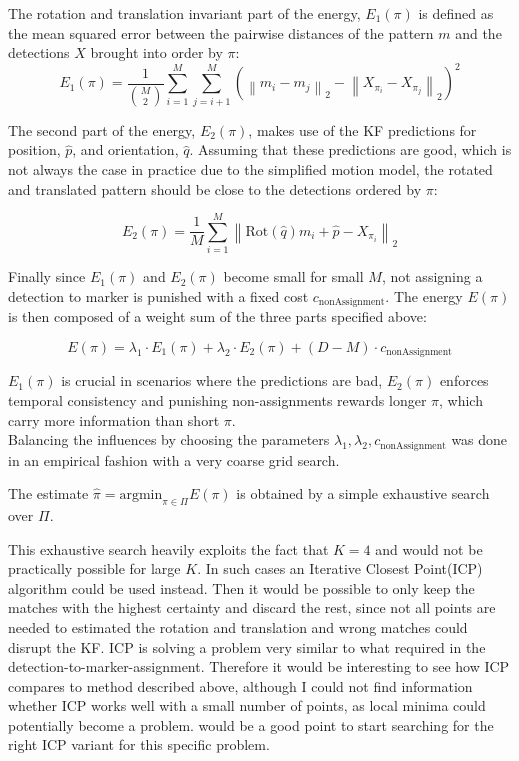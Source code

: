 \documentclass{article}
\begin{document}
The rotation and translation invariant part of the energy, $E_1(\pi)$ is defined as the mean squared error between the pairwise distances of the pattern  $m$ and the detections  $X$ brought into order by $\pi$:
\begin{equation}
	E_1(\pi) =  \frac{1}{\binom{M}{2}}\sum_{i =1}^M\sum_{j =i+1}^M \left( \left\| m_i - m_j\right\|_2 - \left\| X_{\pi_i} - X_{\pi_j}\right\|_2 \right)^2
\end{equation}

The second part of the energy, $E_2(\pi)$, makes use of the KF predictions  for position, $\hat{p}$,  and orientation, $\hat{q}$. Assuming that these predictions are good, which is not always the case in practice due to the simplified motion model, the rotated and translated pattern should be close to the detections ordered by $\pi$:

\begin{equation}
	E_2(\pi) = \frac{1}{M}\sum_{i =1}^M \left\| \text{Rot}(\hat{q})m_i + \hat{p}- X_{\pi_i}\right\|_2 
\end{equation}

Finally since $E_1(\pi)$ and $E_2(\pi) $ become small for small $M$, not assigning a detection to marker is punished with a fixed cost $c_{\text{nonAssignment}}$. The energy $E(\pi)$ is then composed of a weight sum of the three parts specified above:

\begin{equation}
	E(\pi) = \lambda_1 \cdot E_1(\pi) + \lambda_2 \cdot E_2(\pi) + (D-M) \cdot c_{\text{nonAssignment}}
\end{equation}

$E_1(\pi)$ is crucial in scenarios where the predictions are bad, $E_2(\pi)$ enforces temporal consistency and punishing non-assignments rewards longer $\pi$, which carry more information than short $\pi$.\\
Balancing the influences by choosing the parameters $\lambda_1, \lambda_2, c_{\text{nonAssignment}}$ was done in an empirical fashion with a very coarse grid search. %

The estimate 
$
	\hat{\pi} = \text{argmin}_{\pi \in \Pi} E(\pi)
$
is obtained by a simple exhaustive search over $\Pi$.



This exhaustive search heavily exploits the fact that $K=4$ and would not be practically possible for large $K$. In such cases an Iterative Closest Point(ICP) \cite{icp} algorithm could be used instead. Then it would be possible to only keep the matches with the highest certainty and discard the rest, since not all points are needed to estimated the rotation and translation and wrong matches could disrupt the KF. ICP is solving a problem very similar to what required in the detection-to-marker-assignment. Therefore it would be interesting to see how ICP compares to method described above, although I could not find information whether ICP works well with a small number of points, as local minima could potentially become a problem. \cite{icp_review} would be a good point to start searching for the right ICP variant for this specific problem.
\end{document}
